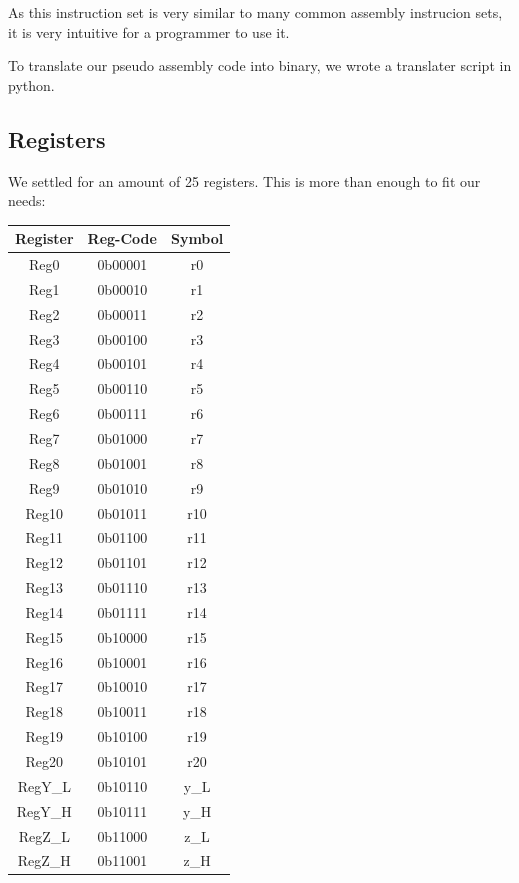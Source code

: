 As this instruction set is very similar to many common assembly instrucion sets, it is very intuitive for a programmer to use it. 

To translate our pseudo assembly code into binary, we wrote a translater script in python.

\subsection{Registers}

We settled for an amount of 25 registers. This is more than enough to fit our needs:

\begin{center}
	\begin{tabular}{ | c | c | c |}
		\hline
		Register	& Reg-Code	& Symbol	\\
		\hline
		Reg0	& 0b00001	& r0	\\
		Reg1	& 0b00010	& r1	\\
		Reg2	& 0b00011	& r2	\\
		Reg3	& 0b00100	& r3	\\
		Reg4	& 0b00101	& r4	\\
		Reg5	& 0b00110	& r5	\\
		Reg6	& 0b00111	& r6	\\
		Reg7	& 0b01000	& r7	\\
		Reg8	& 0b01001	& r8	\\
		Reg9	& 0b01010	& r9	\\
		Reg10	& 0b01011	& r10	\\
		Reg11	& 0b01100	& r11	\\
		Reg12	& 0b01101	& r12	\\
		Reg13	& 0b01110	& r13	\\
		Reg14	& 0b01111	& r14	\\
		Reg15	& 0b10000	& r15	\\
		Reg16	& 0b10001	& r16	\\
		Reg17	& 0b10010	& r17	\\
		Reg18	& 0b10011	& r18	\\
		Reg19	& 0b10100	& r19	\\
		Reg20	& 0b10101	& r20	\\
		RegY\_L	& 0b10110	& y\_L	\\
		RegY\_H	& 0b10111	& y\_H	\\
		RegZ\_L	& 0b11000	& z\_L	\\
		RegZ\_H	& 0b11001	& z\_H	\\
		\hline
	\end{tabular} 
\end{center}

